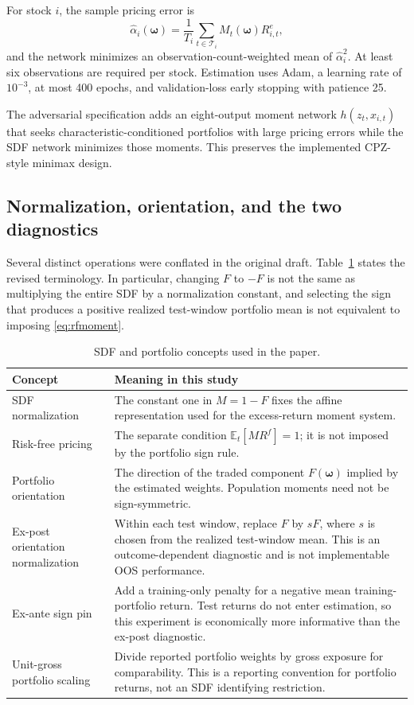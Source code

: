 \documentclass[12pt]{article}
\begin{document}
For stock $i$, the sample pricing error is
\begin{equation}
\widehat\alpha_i(\bm\omega)
=\frac{1}{T_i}\sum_{t\in\mathcal{T}_i}
M_t(\bm\omega)R^e_{i,t},
\label{eq:alpha}
\end{equation}
and the network minimizes an observation-count-weighted mean of $\widehat\alpha_i^2$. At least six observations are required per stock. Estimation uses Adam, a learning rate of $10^{-3}$, at most 400 epochs, and validation-loss early stopping with patience 25.

The adversarial specification adds an eight-output moment network $h(z_t,x_{i,t})$ that seeks characteristic-conditioned portfolios with large pricing errors while the SDF network minimizes those moments. This preserves the implemented CPZ-style minimax design.

\subsection{Normalization, orientation, and the two diagnostics}\label{sec:orientationdefs}

Several distinct operations were conflated in the original draft. Table~\ref{tab:definitions} states the revised terminology. In particular, changing $F$ to $-F$ is not the same as multiplying the entire SDF by a normalization constant, and selecting the sign that produces a positive realized test-window portfolio mean is not equivalent to imposing \eqref{eq:rfmoment}.

\begin{table}[htbp]
\centering
\caption{SDF and portfolio concepts used in the paper.}
\label{tab:definitions}
\small
\begin{tabular}{>{\raggedright\arraybackslash}p{3.2cm}>{\raggedright\arraybackslash}p{8.8cm}}
\toprule
Concept & Meaning in this study \\
\midrule
SDF normalization & The constant one in $M=1-F$ fixes the affine representation used for the excess-return moment system. \\
Risk-free pricing & The separate condition $\mathbb{E}_t[MR^f]=1$; it is not imposed by the portfolio sign rule. \\
Portfolio orientation & The direction of the traded component $F(\bm\omega)$ implied by the estimated weights. Population moments need not be sign-symmetric. \\
Ex-post orientation normalization & Within each test window, replace $F$ by $sF$, where $s$ is chosen from the realized test-window mean. This is an outcome-dependent diagnostic and is not implementable OOS performance. \\
Ex-ante sign pin & Add a training-only penalty for a negative mean training-portfolio return. Test returns do not enter estimation, so this experiment is economically more informative than the ex-post diagnostic. \\
Unit-gross portfolio scaling & Divide reported portfolio weights by gross exposure for comparability. This is a reporting convention for portfolio returns, not an SDF identifying restriction. \\
\bottomrule
\end{tabular}
\end{table}
\end{document}
